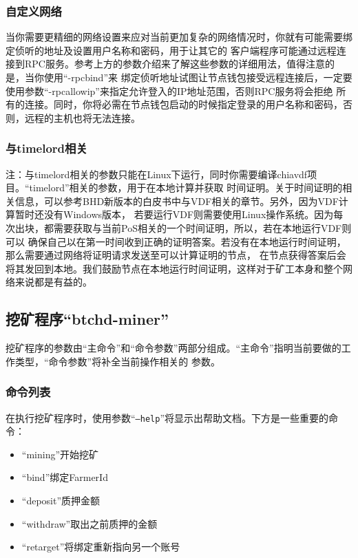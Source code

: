 \subsubsection{自定义网络}
\begin{flushleft}
    当你需要更精细的网络设置来应对当前更加复杂的网络情况时，你就有可能需要绑定侦听的地址及设置用户名称和密码，用于让其它的
    客户端程序可能通过远程连接到RPC服务。参考上方的参数介绍来了解这些参数的详细用法，值得注意的是，当你使用``-rpcbind''来
    绑定侦听地址试图让节点钱包接受远程连接后，一定要使用参数``-rpcallowip''来指定允许登入的IP地址范围，否则RPC服务将会拒绝
    所有的连接。同时，你将必需在节点钱包启动的时候指定登录的用户名称和密码，否则，远程的主机也将无法连接。
\end{flushleft}
\subsubsection{与timelord相关}
\begin{flushleft}
    注：与timelord相关的参数只能在Linux下运行，同时你需要编译chiavdf项目。``timelord''相关的参数，用于在本地计算并获取
    时间证明。关于时间证明的相关信息，可以参考BHD新版本的白皮书中与VDF相关的章节。另外，因为VDF计算暂时还没有Windows版本，
    若要运行VDF则需要使用Linux操作系统。因为每次出块，都需要获取与当前PoS相关的一个时间证明，所以，若在本地运行VDF则可以
    确保自己以在第一时间收到正确的证明答案。若没有在本地运行时间证明，那么需要通过网络将证明请求发送至可以计算证明的节点，
    在节点获得答案后会将其发回到本地。我们鼓励节点在本地运行时间证明，这样对于矿工本身和整个网络来说都是有益的。
\end{flushleft}
\subsection{挖矿程序``btchd-miner''}
\begin{flushleft}
    挖矿程序的参数由``主命令''和``命令参数''两部分组成。``主命令''指明当前要做的工作类型，``命令参数''将补全当前操作相关的
    参数。
\end{flushleft}
\subsubsection{命令列表}
\begin{flushleft}
    在执行挖矿程序时，使用参数``\texttt{--help}''将显示出帮助文档。下方是一些重要的命令：
\end{flushleft}
\begin{itemize}
    \item ``mining''开始挖矿
    \item ``bind''绑定FarmerId
    \item ``deposit''质押金额
    \item ``withdraw''取出之前质押的金额
    \item ``retarget''将绑定重新指向另一个账号
\end{itemize}
